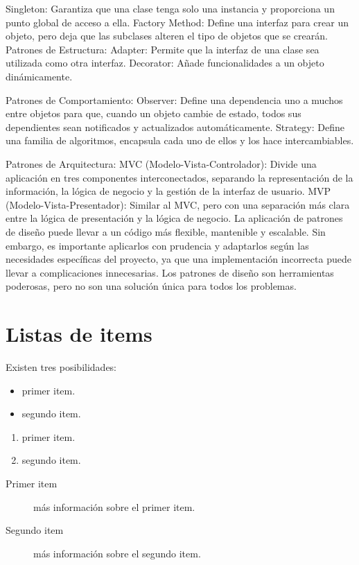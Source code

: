 Singleton: Garantiza que una clase tenga solo una instancia y proporciona un punto global de acceso a ella.
Factory Method: Define una interfaz para crear un objeto, pero deja que las subclases alteren el tipo de objetos que se crearán.
Patrones de Estructura:
Adapter: Permite que la interfaz de una clase sea utilizada como otra interfaz.
Decorator: Añade funcionalidades a un objeto dinámicamente.

Patrones de Comportamiento:
Observer: Define una dependencia uno a muchos entre objetos para que, cuando un objeto cambie de estado, todos sus dependientes sean notificados y actualizados automáticamente.
Strategy: Define una familia de algoritmos, encapsula cada uno de ellos y los hace intercambiables.

Patrones de Arquitectura:
MVC (Modelo-Vista-Controlador): Divide una aplicación en tres componentes interconectados, separando la representación de la información, la lógica de negocio y la gestión de la interfaz de usuario.
MVP (Modelo-Vista-Presentador): Similar al MVC, pero con una separación más clara entre la lógica de presentación y la lógica de negocio.
La aplicación de patrones de diseño puede llevar a un código más flexible, mantenible y escalable. Sin embargo, es importante aplicarlos con prudencia y adaptarlos según las necesidades específicas del proyecto, ya que una implementación incorrecta puede llevar a complicaciones innecesarias. Los patrones de diseño son herramientas poderosas, pero no son una solución única para todos los problemas.




\section{Listas de items}

Existen tres posibilidades:

\begin{itemize}
	\item primer item.
	\item segundo item.
\end{itemize}

\begin{enumerate}
	\item primer item.
	\item segundo item.
\end{enumerate}

\begin{description}
	\item[Primer item] más información sobre el primer item.
	\item[Segundo item] más información sobre el segundo item.
\end{description}
	
